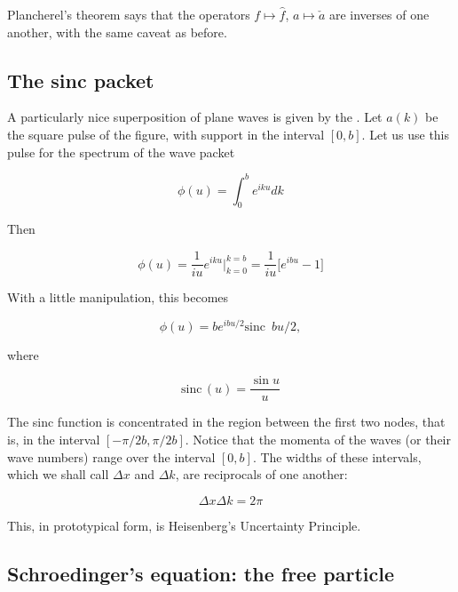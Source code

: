 Plancherel's theorem says that the operators $f\mapsto \hat f$, $a \mapsto \check a$ are inverses of one another, with the same caveat as before.

\subsection{The sinc packet}


A particularly nice superposition of plane waves is given by the .  Let $a(k)$ be the square pulse of the figure, with support in the interval $[0,b]$.  Let us use this pulse for the spectrum of the wave packet

\begin{equation}
\phi(u) = \int_0^b e^{iku} dk
\end{equation}

Then

\begin{equation}
\phi(u) = \frac{1}{iu} e^{iku} \Big\vert_{k=0}^{k=b} =
\frac{1}{iu} \Big[  e^{ibu} - 1 \Big]
\end{equation}

With a little manipulation, this becomes

\begin{equation}
\phi(u) = be^{ibu/2}\text{sinc }\,bu/2,
\end{equation}

where

\begin{equation}
\text{sinc}\,(u)= \frac{\sin u}{u}
\end{equation}

The sinc function is concentrated in the region between the first two nodes, that is, in the interval $[-\pi/2b, \pi/2b]$.  Notice that the momenta of the waves (or their wave numbers) range over the interval $[0,b]$.  The widths of these intervals, which we shall call $\Delta x$ and $\Delta k$, are reciprocals of one another:

\begin{equation}
\Delta x \Delta k =2 \pi
\end{equation}

This, in prototypical form, is Heisenberg's Uncertainty Principle.

\subsection{Schroedinger's equation: the free particle}

